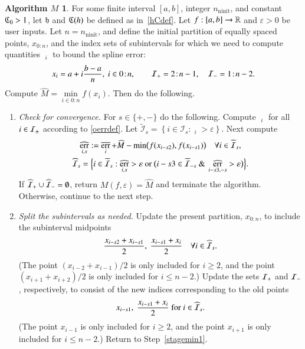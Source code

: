 \documentclass[review]{elsarticle}
\newcommand{\abstol}{\varepsilon}
\newcommand{\zton}{0\!:\!n}
\theoremstyle{definition}
\newtheorem*{algoM}{Algorithm $M$}
\newcommand{\hM}{\widehat{M}}
\DeclareMathOperator{\ninit}{ninit}
\DeclareMathOperator{\oerr}{\overline{err}}
\DeclareMathOperator{\herr}{\widehat{err}}
\newcommand{\minfi}{\min\limits_{i \in 0:n} f(x_i)} %
\begin{document}
\begin{algoM} \label{AlgoM}
	For some finite interval $[a,b]$, integer $n_{\ninit}$, and constant $\mathfrak{C}_0 > 1$, let
	$\mathfrak{h}$ and $\mathfrak{C}(h)$ be defined as in~\eqref{hCdef}.  Let $f:[a,b] \to \mathbb{R}$ and
	$\abstol >0$ be user inputs. Let
	$n=n_{\ninit}$, and define the initial partition of equally spaced points, $x_{0:n}$, and
	the index sets of subintervals for which we need to compute quantities $\oerr_{i}$ to
	bound the spline error:
\[
x_i=a+ i\frac{b-a}{n}, \ i \in \zton, \qquad \ci_{+} =  2\!:\!n-1, \quad \ci_{-} =  1\!:\!n-2.
\]
	Compute $\hM= \minfi$.  Then do the following.
	
	\begin{enumerate}[\em Step 1.]
		
		\item \label{stagemin1} \emph{Check for convergence.} For $ s \in \{+,-\}$ do the 
		following.  
		Compute $\oerr_i $ for all $i \in \mathcal{I}_{\pm}$ according to \eqref{oerrdef}. Let
		$\widetilde{\mathcal{I}}_{s} = \left\{i \in \mathcal{I}_{s}: \oerr_i
		> \abstol \right\}$.  Next compute
		\begin{gather*}
		\herr_{i,s} := \oerr_i + \hM - \min\bigl(f(x_{i - s2}),f(x_{i-s1})\bigr) \quad
		\forall i \in \widetilde{\mathcal{I}}_{s}, 	\\
		\widehat{\ci}_s = \Bigl\{i \in \widetilde{\ci}_s:  \herr_{i,s} > \abstol \text{ or }
		\bigl( i-s3 \in \widetilde{\ci}_{-s} \text{ \& } \herr_{i-s3,-s} > \abstol \bigr) \Bigr\}.	
		\end{gather*}
		If $\widehat{\mathcal{I}}_+ \cup \widehat{\mathcal{I}}_- =
		\emptyset$, return $M(f,\abstol) = \widehat{M}$ and terminate the algorithm.
		Otherwise, continue to the next step.
		
		\item \label{stagemin2} \emph{Split the subintervals as needed.}
		Update the present partition, $x_{0:n}$, to include the subinterval midpoints
		\begin{equation*}
		\frac{x_{i-s2} +x_{i-s1}}{2}, \ \frac{x_{i-s1} +x_{i}}{2} \quad \forall i \in \widehat{\mathcal{I}}_s.
		\end{equation*}
    	(The point $(x_{i-2}+x_{i-1})/2$ is only included for $i \ge 2$, and the point
		$(x_{i+1} +x_{i+2})/2$ is only included for $i \le n-2$.)  Update the sets
		 $\mathcal{I}_{+}$ and $\mathcal{I}_-$,
		respectively, to consist of the new indices corresponding to the old points
		\[
		x_{i-s1}, \ \frac{x_{i-s1} +x_{i}}{2} \text{ for } i \in \widehat{\mathcal{I}}_s.
		\]
		(The point $x_{i-1}$ is only included for $i \ge 2$, and the point $x_{i+1}$ is only
		included for $i \le n-2$.) Return to Step~\ref{stagemin1}.
	\end{enumerate}
\end{algoM}
\end{document}
